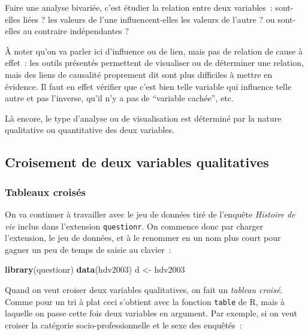 \documentclass[12pt,]{book}
\newenvironment{Shaded}{\begin{snugshade}}{\end{snugshade}}
\newcommand{\KeywordTok}[1]{\textcolor[rgb]{0.27,0.27,0.27}{\textbf{#1}}}
\newcommand{\NormalTok}[1]{#1}
\newcommand{\StringTok}[1]{\textcolor[rgb]{0.5,0.5,0.5}{#1}}
\begin{document}
Faire une analyse bivariée, c'est étudier la relation entre deux variables~: sont-elles liées ? les valeurs de l'une influencent-elles les valeurs de l'autre ? ou sont-elles au contraire indépendantes ?

À noter qu'on va parler ici d'influence ou de lien, mais pas de relation de cause à effet~: les outils présentés permettent de visualiser ou de déterminer une relation, mais des liens de causalité proprement dit sont plus difficiles à mettre en évidence. Il faut en effet vérifier que c'est bien telle variable qui influence telle autre et pas l'inverse, qu'il n'y a pas de ``variable cachée'', etc.

Là encore, le type d'analyse ou de visualisation est déterminé par la nature qualitative ou quantitative des deux variables.

\hypertarget{croisement-de-deux-variables-qualitatives}{%
\subsection{Croisement de deux variables qualitatives}\label{croisement-de-deux-variables-qualitatives}}

\hypertarget{tableaux-croisuxe9s}{%
\subsubsection{Tableaux croisés}\label{tableaux-croisuxe9s}}

On va continuer à travailler avec le jeu de données tiré de l'enquête \emph{Histoire de vie} inclus dans l'extension \texttt{questionr}. On commence donc par charger l'extension, le jeu de données, et à le renommer en un nom plus court pour gagner un peu de temps de saisie au clavier~:

\begin{Shaded}
\begin{Highlighting}[]
\KeywordTok{library}\NormalTok{(questionr)}
\KeywordTok{data}\NormalTok{(hdv2003)}
\NormalTok{d <-}\StringTok{ }\NormalTok{hdv2003}
\end{Highlighting}
\end{Shaded}

Quand on veut croiser deux variables qualitatives, on fait un \emph{tableau croisé}. Comme pour un tri à plat ceci s'obtient avec la fonction \texttt{table} de R, mais à laquelle on passe cette fois deux variables en argument. Par exemple, si on veut croiser la catégorie socio-professionnelle et le sexe des enquêtés~:
\end{document}
